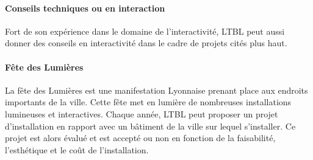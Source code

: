 \paragraph{Conseils techniques ou en interaction} Fort de son expérience dans le domaine de l'interactivité, LTBL peut aussi donner des conseils en interactivité dans le cadre de projets cités plus haut.

\paragraph{Fête des Lumières} La fête des Lumières est une manifestation Lyonnaise prenant place aux endroits importants de la ville.
Cette fête met en lumière de nombreuses installations lumineuses et interactives.
Chaque année, LTBL peut proposer un projet d'installation en rapport avec un bâtiment de la ville sur lequel s'installer.
Ce projet est alors évalué et est accepté ou non en fonction de la faisabilité, l'esthétique et le coût de l'installation.